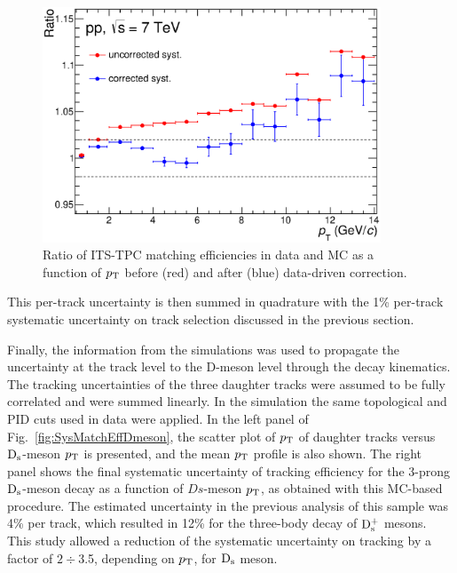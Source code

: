 \begin{enumerate}
\begin{figure}[!htb]
\begin{center}
\includegraphics[height=7cm]{FigCap4/ITSTPCmatchEffSyst_10bpass4_vsPt.eps}
\caption{Ratio of ITS-TPC matching efficiencies in data and MC as a function of $p_{\rm T}$ before (red) and after (blue) data-driven correction.}
\label{fig:MatchEffSystVsPt}
\end{center}
\end{figure}
This per-track uncertainty is then summed in quadrature with the 
1\% per-track systematic uncertainty on track selection discussed in the previous section. 
\end{enumerate}
Finally, the information from the simulations was used to propagate the uncertainty at the 
track level to the D-meson level through the decay 
kinematics. The tracking uncertainties of the three daughter tracks 
were assumed to be fully correlated and were summed linearly.
In the simulation the same topological and PID cuts used in data were 
applied. In the left panel of Fig.~\ref{fig:SysMatchEffDmeson}, the scatter plot of 
$p_{\rm T}$ of daughter tracks versus 
${\rm D_s}$-meson $p_{\rm T}$ is presented, and the mean $p_{\rm T}$ profile is also shown. 
The right panel shows the final systematic uncertainty of tracking 
efficiency for the 3-prong ${\rm D_s}$-meson decay as a function of $Ds$-meson $p_{\rm T}$, 
as obtained with this MC-based procedure.
The estimated uncertainty in the previous analysis of this sample was 4\% per track, 
which resulted in 12\% for the three-body decay of ${\rm D_s^+}$ mesons.
This study allowed a reduction of the systematic uncertainty on tracking 
by a factor of $2 \div$3.5, depending on $p_{\rm T}$, for ${\rm D_s}$ meson. 

